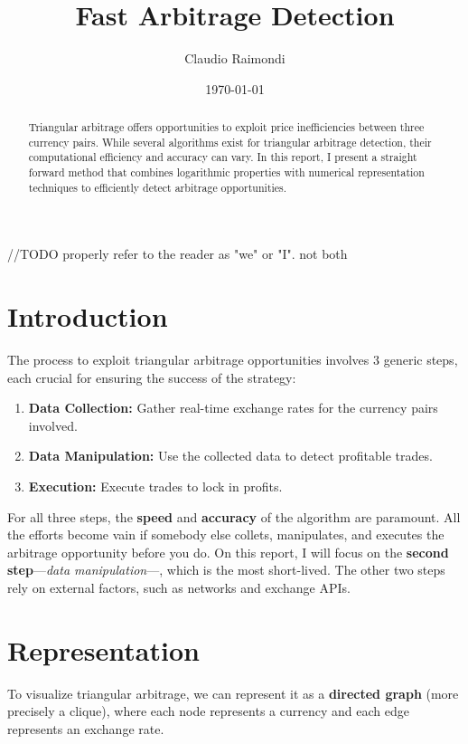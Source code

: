 \documentclass[11pt]{article}
\begin{document}
\title{Fast Arbitrage Detection}
\author{Claudio Raimondi}
\date{\today}
\maketitle

//TODO properly refer to the reader as "we" or "I". not both

\begin{abstract}
Triangular arbitrage offers opportunities to exploit price inefficiencies between three currency pairs. While several algorithms exist for triangular arbitrage detection, their computational efficiency and accuracy can vary. In this report, I present a straight forward method that combines logarithmic properties with numerical representation techniques to efficiently detect arbitrage opportunities.
\end{abstract}

\tableofcontents

\section{Introduction}
The process to exploit triangular arbitrage opportunities involves 3 generic steps, each crucial for ensuring the success of the strategy:
\begin{enumerate}
    \item \textbf{Data Collection:} Gather real-time exchange rates for the currency pairs involved.
    \item \textbf{Data Manipulation:} Use the collected data to detect profitable trades.
    \item \textbf{Execution:} Execute trades to lock in profits.
\end{enumerate}
For all three steps, the \textbf{speed} and \textbf{accuracy} of the algorithm are paramount. All the efforts become vain if somebody else collets, manipulates, and executes the arbitrage opportunity before you do.
On this report, I will focus on the \textbf{second step}---\textit{data manipulation}---, which is the most short-lived. The other two steps rely on external factors, such as networks and exchange APIs.

\section{Representation}
To visualize triangular arbitrage, we can represent it as a \textbf{directed graph} (more precisely a clique), where each node represents a currency and each edge represents an exchange rate.
\end{document}
